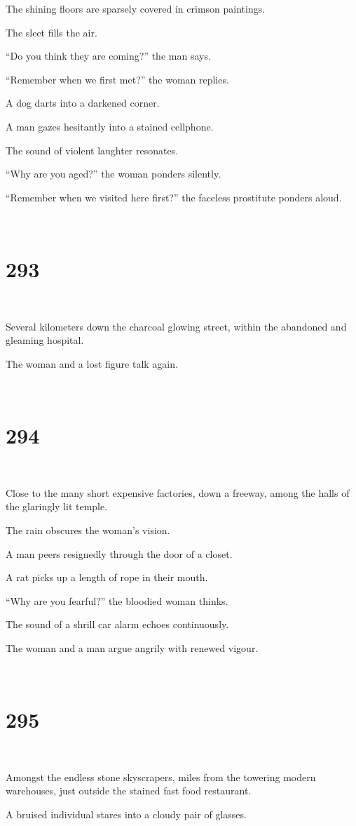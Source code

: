 \documentclass{report}
\begin{document}
The shining floors are sparsely covered in crimson paintings.

The sleet fills the air.

``Do you think they are coming?'' the man says.

``Remember when we first met?'' the woman replies.

A dog darts into a darkened corner.

A man gazes hesitantly into a stained cellphone.

The sound of violent laughter resonates.

``Why are you aged?'' the woman ponders silently.

``Remember when we visited here first?'' the faceless prostitute ponders aloud.

~
\chapter*{293}
~

Several kilometers down the charcoal glowing street, within the abandoned and gleaming hospital.

The woman and a lost figure talk again.

~
\chapter*{294}
~

Close to the many short expensive factories, down a freeway, among the halls of the glaringly lit temple.

The rain obscures the woman's vision.

A man peers resignedly through the door of a closet.

A rat picks up a length of rope in their mouth.

``Why are you fearful?'' the bloodied woman thinks.

The sound of a shrill car alarm echoes continuously.

The woman and a man argue angrily with renewed vigour.

~
\chapter*{295}
~

Amongst the endless stone skyscrapers, miles from the towering modern warehouses, just outside the stained fast food restaurant.

A bruised individual stares into a cloudy pair of glasses.
\end{document}

